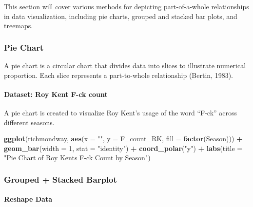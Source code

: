 \documentclass[
]{book}
\newenvironment{Shaded}{\begin{snugshade}}{\end{snugshade}}
\newcommand{\AttributeTok}[1]{\textcolor[rgb]{0.13,0.29,0.53}{#1}}
\newcommand{\DecValTok}[1]{\textcolor[rgb]{0.00,0.00,0.81}{#1}}
\newcommand{\FunctionTok}[1]{\textcolor[rgb]{0.13,0.29,0.53}{\textbf{#1}}}
\newcommand{\NormalTok}[1]{#1}
\newcommand{\SpecialCharTok}[1]{\textcolor[rgb]{0.81,0.36,0.00}{\textbf{#1}}}
\newcommand{\StringTok}[1]{\textcolor[rgb]{0.31,0.60,0.02}{#1}}
\begin{document}
This section will cover various methods for depicting part-of-a-whole relationships in data visualization, including pie charts, grouped and stacked bar plots, and treemaps.

\subsubsection*{Pie Chart}\label{pie-chart}

A pie chart is a circular chart that divides data into slices to illustrate numerical proportion. Each slice represents a part-to-whole relationship (Bertin, 1983).

\paragraph{Dataset: Roy Kent F-ck count}\label{dataset-roy-kent-f-ck-count}

A pie chart is created to visualize Roy Kent's usage of the word ``F-ck'' across different seasons.

\begin{Shaded}
\begin{Highlighting}[]
\FunctionTok{ggplot}\NormalTok{(richmondway, }\FunctionTok{aes}\NormalTok{(}\AttributeTok{x =} \StringTok{""}\NormalTok{, }\AttributeTok{y =}\NormalTok{ F\_count\_RK, }\AttributeTok{fill =} \FunctionTok{factor}\NormalTok{(Season))) }\SpecialCharTok{+}
  \FunctionTok{geom\_bar}\NormalTok{(}\AttributeTok{width =} \DecValTok{1}\NormalTok{, }\AttributeTok{stat =} \StringTok{"identity"}\NormalTok{) }\SpecialCharTok{+}
  \FunctionTok{coord\_polar}\NormalTok{(}\StringTok{"y"}\NormalTok{) }\SpecialCharTok{+}
  \FunctionTok{labs}\NormalTok{(}\AttributeTok{title =} \StringTok{"Pie Chart of Roy Kent\textquotesingle{}s F{-}ck Count by Season"}\NormalTok{)}
\end{Highlighting}
\end{Shaded}

\subsubsection*{Grouped + Stacked Barplot}\label{grouped-stacked-barplot}

\paragraph*{Reshape Data}\label{reshape-data}
\end{document}
